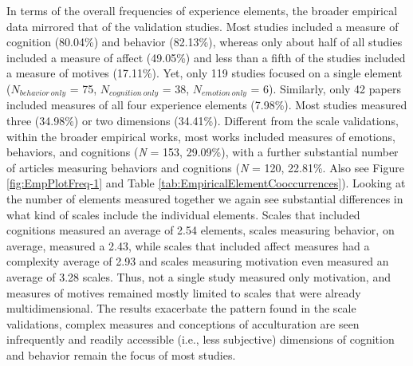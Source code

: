 In terms of the overall frequencies of experience elements, the broader
empirical data mirrored that of the validation studies. Most studies
included a measure of cognition (80.04\%) and behavior (82.13\%),
whereas only about half of all studies included a measure of affect
(49.05\%) and less than a fifth of the studies included a measure of
motives (17.11\%). Yet, only 119 studies focused on a single element
(\(N_{behavior\ only}\) = 75, \(N_{cognition\ only}\) = 38,
\(N_{emotion\ only}\) = 6). Similarly, only 42 papers included measures
of all four experience elements (7.98\%). Most studies measured three
(34.98\%) or two dimensions (34.41\%). Different from the scale
validations, within the broader empirical works, most works included
measures of emotions, behaviors, and cognitions (\textit{N} = 153,
29.09\%), with a further substantial number of articles measuring
behaviors and cognitions (\textit{N} = 120, 22.81\%. Also see Figure
\ref{fig:EmpPlotFreq-1} and Table
\ref{tab:EmpiricalElementCooccurrences}). Looking at the number of
elements measured together we again see substantial differences in what
kind of scales include the individual elements. Scales that included
cognitions measured an average of 2.54 elements, scales measuring
behavior, on average, measured a 2.43, while scales that included affect
measures had a complexity average of 2.93 and scales measuring
motivation even measured an average of 3.28 scales. Thus, not a single
study measured only motivation, and measures of motives remained mostly
limited to scales that were already multidimensional. The results
exacerbate the pattern found in the scale validations, complex measures
and conceptions of acculturation are seen infrequently and readily
accessible (i.e., less subjective) dimensions of cognition and behavior
remain the focus of most studies.

